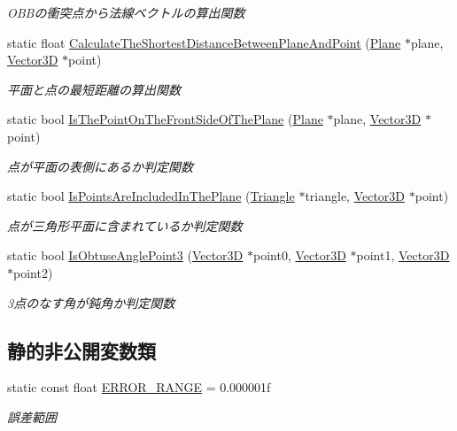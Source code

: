 \begin{DoxyCompactItemize}
\begin{DoxyCompactList}\small\item\em O\+B\+Bの衝突点から法線ベクトルの算出関数 \end{DoxyCompactList}\item 
static float \mbox{\hyperlink{class_collision_calculation_aec3051cecbe8e3144f8e55ff0cde88b1}{Calculate\+The\+Shortest\+Distance\+Between\+Plane\+And\+Point}} (\mbox{\hyperlink{class_plane}{Plane}} $\ast$plane, \mbox{\hyperlink{class_vector3_d}{Vector3D}} $\ast$point)
\begin{DoxyCompactList}\small\item\em 平面と点の最短距離の算出関数 \end{DoxyCompactList}\item 
static bool \mbox{\hyperlink{class_collision_calculation_a701a3c55252bc38e99db0d4fd1e2a0e8}{Is\+The\+Point\+On\+The\+Front\+Side\+Of\+The\+Plane}} (\mbox{\hyperlink{class_plane}{Plane}} $\ast$plane, \mbox{\hyperlink{class_vector3_d}{Vector3D}} $\ast$point)
\begin{DoxyCompactList}\small\item\em 点が平面の表側にあるか判定関数 \end{DoxyCompactList}\item 
static bool \mbox{\hyperlink{class_collision_calculation_a05b47fd8be9f41d50a2650d94b0067fe}{Is\+Points\+Are\+Included\+In\+The\+Plane}} (\mbox{\hyperlink{class_triangle}{Triangle}} $\ast$triangle, \mbox{\hyperlink{class_vector3_d}{Vector3D}} $\ast$point)
\begin{DoxyCompactList}\small\item\em 点が三角形平面に含まれているか判定関数 \end{DoxyCompactList}\item 
static bool \mbox{\hyperlink{class_collision_calculation_acbe892c7c4a7748b725753ac863e88d3}{Is\+Obtuse\+Angle\+Point3}} (\mbox{\hyperlink{class_vector3_d}{Vector3D}} $\ast$point0, \mbox{\hyperlink{class_vector3_d}{Vector3D}} $\ast$point1, \mbox{\hyperlink{class_vector3_d}{Vector3D}} $\ast$point2)
\begin{DoxyCompactList}\small\item\em 3点のなす角が鈍角か判定関数 \end{DoxyCompactList}\end{DoxyCompactItemize}
\subsection*{静的非公開変数類}
\begin{DoxyCompactItemize}
\item 
static const float \mbox{\hyperlink{class_collision_calculation_a6f6b9027419102e1ac9dc56f81f87ceb}{E\+R\+R\+O\+R\+\_\+\+R\+A\+N\+GE}} = 0.\+000001f
\begin{DoxyCompactList}\small\item\em 誤差範囲 \end{DoxyCompactList}\end{DoxyCompactItemize}


